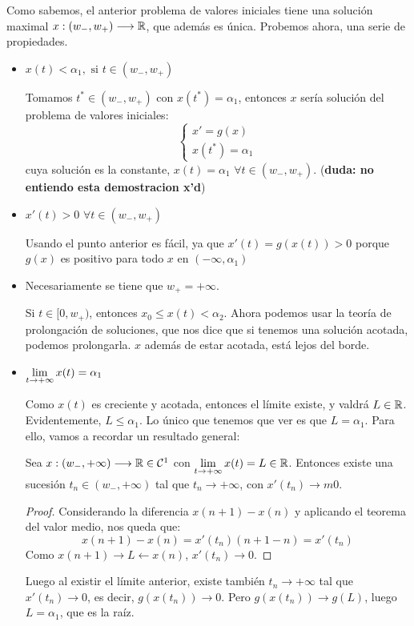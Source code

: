 \begin{example}
Como sabemos, el anterior problema de valores iniciales tiene una solución maximal $x : (w_-,w_+) \longrightarrow \mathbb{R}$, que además es única. Probemos ahora, una serie de propiedades.
\begin{itemize}
\item $x(t)<\alpha_1, \text{ si } t\in(w_-,w_+)$

Tomamos $t^*\in(w_-,w_+)$ con $x(t^*)=\alpha_1$, entonces $x$ sería solución del problema de valores iniciales:
\[
\left\{
\begin{array}{l}
x'=g(x) \\
x(t^*)=\alpha_1
\end{array}
\right.
\]
cuya solución es la constante, $x(t)=\alpha_1$ $\forall t\in(w_-,w_+)$. (\textbf{duda: no entiendo esta demostracion x'd})

\item $x'(t)>0$ $\forall t\in(w_-,w_+)$

Usando el punto anterior es fácil, ya que $x'(t)=g(x(t))>0$ porque $g(x)$ es positivo para todo $x$ en $(-\infty, \alpha_1)$

\item Necesariamente se tiene que $w_+=+\infty$.

Si $t\in[0,w_+)$, entonces $x_0\leq x(t) < \alpha_2$. Ahora podemos usar la teoría de prolongación de soluciones, que nos dice que si tenemos una solución acotada, podemos prolongarla. $x$ además de estar acotada, está lejos del borde. 

\item $\displaystyle\lim_{  t  \to +\infty }  x(t) =\alpha_1$

Como $x(t)$ es creciente y acotada, entonces el límite existe, y valdrá $L\in\mathbb{R}$. Evidentemente, $L\leq \alpha_1$. Lo único que tenemos que ver es que $L=\alpha_1$. Para ello, vamos a recordar un resultado general:
\begin{lemma}
Sea $x : (w_-,+\infty) \longrightarrow \mathbb{R}\in\mathcal{C}^1$ con $\displaystyle\lim_{  t  \to +\infty }  x(t) =L\in\mathbb{R}$. Entonces existe una sucesión $t_n\in(w_-,+\infty)$ tal que $t_n\longrightarrow +\infty$, con $x'(t_n)\longrightarrow m0$.
\end{lemma}
\begin{proof}
Considerando la diferencia $x(n+1)-x(n)$ y aplicando el teorema del valor medio, nos queda que:
\[
x(n+1)-x(n)=x'(t_n)(n+1-n)=x'(t_n)
\]
Como $x(n+1)\longrightarrow L \leftarrow x(n)$, $x'(t_n)\longrightarrow 0$.
\end{proof}
Luego al existir el límite anterior, existe también $t_n\longrightarrow +\infty$ tal que $x'(t_n)\longrightarrow 0$, es decir, $g(x(t_n))\longrightarrow 0$.  Pero $g(x(t_n))\longrightarrow g(L)$, luego $L=\alpha_1$, que es la raíz.
\end{itemize}


\end{example}
